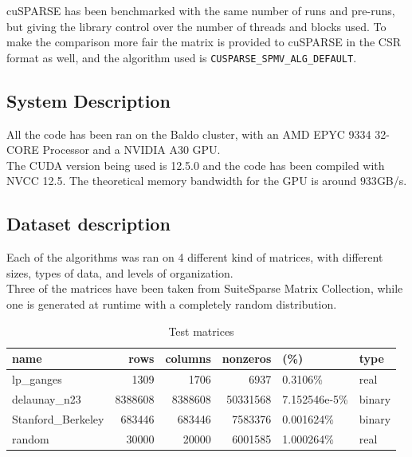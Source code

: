 \documentclass[conference]{IEEEtran}
\begin{document}
cuSPARSE has been benchmarked with the same number of runs and pre-runs, but giving the library control over the number of threads and blocks used. To make the comparison more fair the matrix is provided to cuSPARSE in the CSR format as well, and the algorithm used is \texttt{CUSPARSE\_SPMV\_ALG\_DEFAULT}.

\subsection{System Description}

All the code has been ran on the Baldo cluster, with an AMD EPYC 9334 32-CORE Processor and a NVIDIA A30 GPU.\\
The CUDA version being used is 12.5.0 and the code has been compiled with NVCC 12.5.
The theoretical memory bandwidth for the GPU is around $933$GB/s.

\subsection{Dataset description}
Each of the algorithms was ran on 4 different kind of matrices, with different sizes, types of data, and levels of organization.\\
Three of the matrices have been taken from SuiteSparse Matrix Collection, while one is generated at runtime with a completely random distribution.
\begin{table}[ht!]
    \centering
    \begin{adjustbox}{width=\columnwidth}
        \begin{tabular}{l|r|r|rl|l}
            name & rows & columns & nonzeros & (\%) & type \\
            \hline
            lp\_ganges\footnote & 1309 & 1706 & 6937 & 0.3106\% & real \\
            delaunay\_n23\footnotemark & 8388608 & 8388608 & 50331568 & 7.152546e-5\% & binary \\
            Stanford\_Berkeley\footnotemark & 683446 & 683446 & 7583376 & 0.001624\% & binary \\
            random & 30000 & 20000 & 6001585 & 1.000264\% & real \\
        \end{tabular}
    \end{adjustbox}
    \caption{Test matrices}
    \label{tab:matrices}
\end{table}
\end{document}
